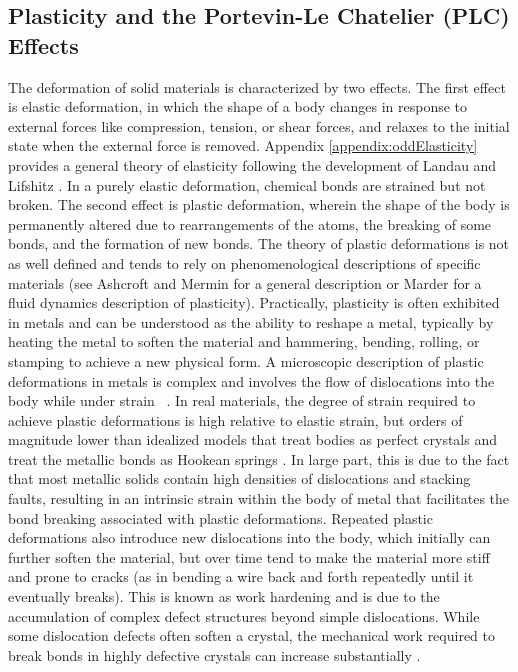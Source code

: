 \FloatBarrier
\subsection{Plasticity and the Portevin-Le Chatelier (PLC) Effects}
The deformation of solid materials is characterized by two effects.  The first effect is elastic deformation, in which the shape of a body changes in response to external forces like compression, tension, or shear forces, and relaxes to the initial state when the external force is removed.  Appendix \ref{appendix:oddElasticity} provides a general theory of elasticity following the development of Landau and Lifshitz \cite{landau2012theory}.  In a purely elastic deformation, chemical bonds are strained but not broken.  The second effect is plastic deformation, wherein the shape of the body is permanently altered due to rearrangements of the atoms, the breaking of some bonds, and the formation of new bonds.  The theory of plastic deformations is not as well defined and tends to rely on phenomenological descriptions of specific materials (see Ashcroft and Mermin \cite{ashcroft_mermin_1976_ch30} for a general description or Marder \cite{marder_2000_ch15_title} for a fluid dynamics description of plasticity).  Practically, plasticity is often exhibited in metals and can be understood as the ability to reshape a metal, typically by heating the metal to soften the material and hammering, bending, rolling, or stamping to achieve a new physical form.  A microscopic description of plastic deformations in metals is complex and involves the flow of dislocations into the body while under strain ~\cite{marder_2000_ch15_title}.  In real materials, the degree of strain required to achieve plastic deformations is high relative to elastic strain, but orders of magnitude lower than idealized models that treat bodies as perfect crystals and treat the metallic bonds as Hookean springs \cite{ashcroft_mermin_1976_ch30}.  In large part, this is due to the fact that most metallic solids contain high densities of dislocations and stacking faults, resulting in an intrinsic strain within the body of metal that facilitates the bond breaking associated with plastic deformations.  Repeated plastic deformations also introduce new dislocations into the body, which initially can further soften the material, but over time tend to make the material more stiff and prone to cracks (as in bending a wire back and forth repeatedly until it eventually breaks).  This is known as work hardening and is due to the accumulation of complex defect structures beyond simple dislocations.  While some dislocation defects often soften a crystal, the mechanical work required to break bonds in highly defective crystals can increase substantially \cite{ashcroft_mermin_1976_ch30}.

